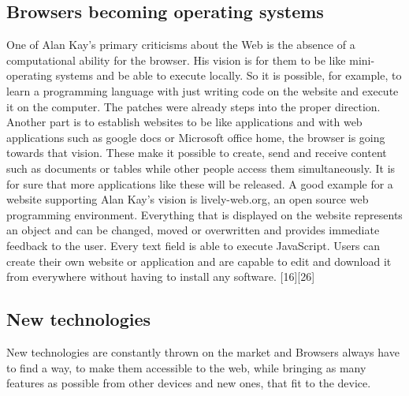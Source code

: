\documentclass[runningheads]{llncs}
\begin{document}
		\subsection{Browsers becoming operating systems}
	One of Alan Kay's primary criticisms about the Web is the absence of a computational ability for the browser. His vision is for them to be like mini-operating systems and be able to execute locally. So it is possible, for example, to learn a programming language with just writing code on the website and execute it on the computer. The patches were already steps into the proper direction. Another part is to establish websites to be like applications and with web applications such as google docs or Microsoft office home, the browser is going towards that vision. These make it possible to create, send and receive content such as documents or tables while other people access them simultaneously. It is for sure that more applications like these will be released.
	A good example for a website supporting Alan Kay's vision is lively-web.org, an open source web programming environment.
	Everything that is displayed on the website represents an object and can be changed, moved or overwritten and provides immediate feedback to the user. Every text field is able to execute JavaScript. Users can create their own website or application and are capable to edit and download it from everywhere without having to install any software.
	[16][26]
		\subsection{New technologies}
		New technologies are constantly thrown on the market and Browsers always have to find a way, to make them accessible to the web, while bringing as many features as possible from other devices and new ones, that fit to the device.
\end{document}
